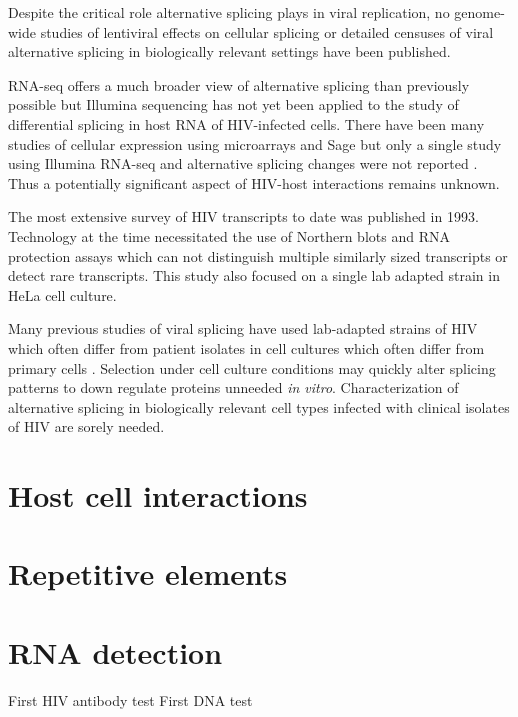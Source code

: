 \documentclass[../sherrill-Mix_thesis.tex]{subfiles}
\begin{document}
	Despite the critical role alternative splicing plays in viral replication, no genome-wide studies of lentiviral effects on cellular splicing or  detailed censuses of viral alternative splicing in biologically relevant settings have been published.

	RNA-seq offers a much broader view of alternative splicing than previously possible \citep{Trapnell2010,Rogers2012} but Illumina sequencing has not yet been applied to the study of differential splicing in host RNA of HIV-infected cells. There have been many studies of cellular expression using microarrays \citep{Vahey2002,Wout2003,Mitchell2003,Rotger2010,Miller2011} and Sage \citep{Ryo1999,Lefebvre2011} but only a single study using Illumina RNA-seq and alternative splicing changes were not reported \citep{Chang2011}. Thus a potentially significant aspect of HIV-host interactions remains unknown.

	The most extensive survey of HIV transcripts to date was published in 1993\citep{Purcell1993}. Technology at the time necessitated the use of Northern blots and RNA protection assays \citep{Purcell1993} which can not distinguish multiple similarly sized transcripts or detect rare transcripts. This study also focused on a single lab adapted \hivNL{} strain in HeLa cell culture.

	Many previous studies of viral splicing have used lab-adapted strains of HIV which often differ from patient isolates \citep{Fujita1992} in cell cultures which often differ from primary cells \citep{McAllister1971}. Selection under cell culture conditions may quickly alter splicing patterns to down regulate proteins unneeded \emph{in vitro}.  Characterization of alternative splicing in biologically relevant cell types infected with clinical isolates of HIV are sorely needed.


\section{Host cell interactions}
\section{Repetitive elements}
\section{RNA detection}
	First HIV antibody test \citep{Safai1984,Sarngadharan1984} First DNA test \citep{Ou1988}
\end{document}
